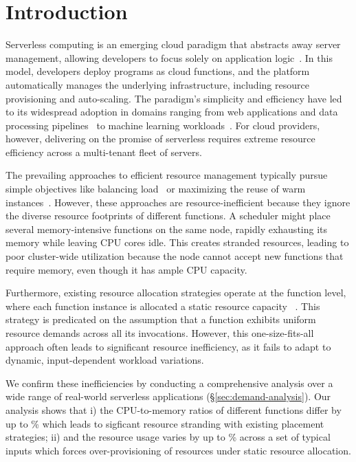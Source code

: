 \section{Introduction}
\label{sec:introduction}

Serverless computing is an emerging cloud paradigm that abstracts away server management, allowing developers to focus solely on application logic~\cite{CACM19:Rise, TR19:Berkeley, CACM21:Serverless}. In this model, developers deploy programs as cloud functions, and the platform automatically manages the underlying infrastructure, including resource provisioning and auto-scaling. The paradigm's simplicity and efficiency have led to its widespread adoption in domains ranging from web applications and data processing pipelines~\cite{Doc:AzureWebApp, NSDI19:Shuffling, OSDI18:Pocket} to machine learning workloads~\cite{SC20:Batch, OSDI21:Dorylus}. For cloud providers, however, delivering on the promise of serverless requires extreme resource efficiency across a multi-tenant fleet of servers.

The prevailing approaches to efficient resource management typically pursue simple objectives like balancing load~\cite{SoCC22:Hermod, Doc:Knative, Doc:OpenFaaS} or maximizing the reuse of warm instances~\cite{ASPLOS21:FaasCache, ASPLOS24:RainbowCake, ASPLOS22:IceBreaker, ATC20:SitW, SoCC22:Hermod, Doc:OpenWhisk}. However, these approaches are resource-inefficient because they ignore the diverse resource footprints of different functions. A scheduler might place several memory-intensive functions on the same node, rapidly exhausting its memory while leaving CPU cores idle. This creates stranded resources, leading to poor cluster-wide utilization because the node cannot accept new functions that require memory, even though it has ample CPU capacity.

Furthermore, existing resource allocation strategies operate at the function level, where each function instance is allocated a static resource capacity~\cite{Doc:AWS_Lambda_Mem, Doc:Azure_Functions_Hosting, Doc:GCP_CloudRun_Mem, ASPLOS21:FaasCache} . This strategy is predicated on the assumption that a function exhibits uniform resource demands across all its invocations. However, this one-size-fits-all approach often leads to significant resource inefficiency, as it fails to adapt to dynamic, input-dependent workload variations.

We confirm these inefficiencies by conducting a comprehensive analysis over a wide range of real-world serverless applications (\S\ref{sec:demand-analysis}). Our analysis shows that i) the CPU-to-memory ratios of different functions differ by up to \todo{}\% which leads to sigficant resource stranding with existing placement strategies; ii) and the resource usage varies by up to \todo{}\% across a set of typical inputs which forces over-provisioning of resources under static resource allocation. 

